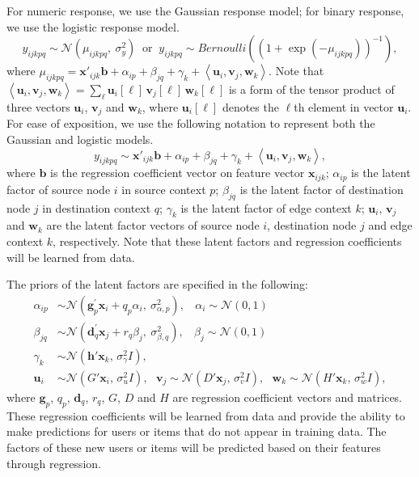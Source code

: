 \documentclass[10pt]{article}
\newcommand{\parahead}[1]{\vspace{0.15in}\noindent{\bf #1:}}
\begin{document}
\parahead{Response model}
For numeric response, we use the Gaussian response model; for binary response, we use the logistic response model.
\begin{equation*}
y_{ijkpq} \sim \mathcal{N}(\mu_{ijkpq},~ \sigma^2_{y}) ~\textrm{ or }~
y_{ijkpq} \sim \textit{Bernoulli}((1 + \exp(-\mu_{ijkpq}))^{-1}),
\end{equation*}
where $\mu_{ijkpq} = \bm{x}'_{ijk} \bm{b} + \alpha_{ip} + \beta_{jq} + \gamma_{k} + \left<\bm{u}_i, \bm{v}_j, \bm{w}_k\right>$.  Note that $\left<\bm{u}_i, \bm{v}_j, \bm{w}_k\right> = \sum_{\ell} \bm{u}_i[\ell]\, \bm{v}_j[\ell]\, \bm{w}_k[\ell]$ is a form of the tensor product of three vectors $\bm{u}_i$, $\bm{v}_j$ and $\bm{w}_k$, where $\bm{u}_i[\ell]$ denotes the $\ell$th element in vector $\bm{u}_i$.
For ease of exposition, we use the following notation to represent both the Gaussian and logistic models.
\begin{equation}
y_{ijkpq} \sim \bm{x}'_{ijk} \bm{b} + \alpha_{ip} + \beta_{jq} + \gamma_{k} + \left<\bm{u}_i, \bm{v}_j, \bm{w}_k\right>, \label{eq:uvw-model}
\end{equation}
where $\bm{b}$ is the regression coefficient vector on feature vector $\bm{x}_{ijk}$; $\alpha_{ip}$ is the latent factor of source node $i$ in source context $p$; $\beta_{jq}$ is the latent factor of destination node $j$ in destination context $q$; $\gamma_{k}$ is the latent factor of edge context $k$; $\bm{u}_i$, $\bm{v}_j$ and $\bm{w}_k$ are the latent factor vectors of source node $i$, destination node $j$ and edge context $k$, respectively.  Note that these latent factors and regression coefficients will be learned from data.

\parahead{Regression Priors}
The priors of the latent factors are specified in the following:
\begin{align}
\alpha_{ip} & \sim \mathcal{N}(\bm{g}_{p}^\prime \bm{x}_{i} + q_{p} \alpha_i, ~\sigma_{\alpha,p}^2),
	~~~~ \alpha_i \sim \mathcal{N}(0, 1) \label{eq:alpha} \\
\beta_{jq} & \sim \mathcal{N}(\bm{d}_{q}^\prime \bm{x}_{j} + r_{q} \beta_j, ~\sigma_{\beta,q}^2),
	~~~~ \beta_j  \sim \mathcal{N}(0, 1) \label{eq:beta} \\
\gamma_{k} & \sim \mathcal{N}(\bm{h}' \bm{x}_k, \,\sigma_{\gamma}^2 I), \\
\bm{u}_{i} & \sim \mathcal{N}(G' \bm{x}_i, \,\sigma_{u}^2 I), ~~~
\bm{v}_{j} \sim \mathcal{N}(D' \bm{x}_j, \,\sigma_{v}^2 I), ~~~
\bm{w}_{k} \sim \mathcal{N}(H' \bm{x}_k, \,\sigma_{w}^2 I), \label{eq:uvw}
\end{align}
where $\bm{g}_p$, $q_p$, $\bm{d}_q$, $r_q$, $G$, $D$ and $H$ are regression coefficient vectors and matrices.  These regression coefficients will be learned from data and provide the ability to make predictions for users or items that do not appear in training data.  The factors of these new users or items will be predicted based on their features through regression.
\end{document}
